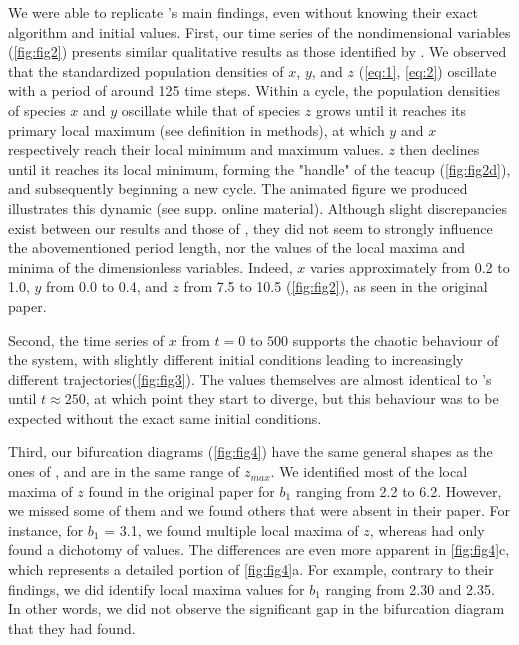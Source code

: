 We were able to replicate \citeauthor{hastings1991}'s main findings, even without knowing their
exact algorithm and initial values.
First, our time series of the nondimensional variables (\autoref{fig:fig2}) presents similar
qualitative results as those identified by \citeauthor{hastings1991}.
We observed that the standardized population densities of $x$, $y$, and $z$ (\autoref{eq:1}, \autoref{eq:2})
oscillate with a period of around 125 time steps.
Within a cycle, the population densities of species $x$ and $y$ oscillate while that of
species $z$ grows until it reaches its primary local maximum (see definition in methods),
at which $y$ and $x$ respectively reach their local minimum and maximum values.
$z$ then declines until it reaches its local minimum, forming the "handle" of the teacup
(\autoref{fig:fig2d}), and subsequently beginning a new cycle.
The animated figure we produced illustrates this dynamic (see supp.
online material).
Although slight discrepancies exist between our results and those of \citeauthor{hastings1991},
they did not seem to strongly influence the abovementioned period length, nor the values
of the local maxima and minima of the dimensionless variables.
Indeed, $x$ varies approximately from 0.2 to 1.0, $y$ from 0.0 to 0.4, and $z$ from 7.5 to
10.5 (\autoref{fig:fig2}), as seen in the original paper.

Second, the time series of $x$ from $t = 0$ to $500$ supports the chaotic behaviour of the
system, with slightly different initial conditions leading to increasingly different
trajectories(\autoref{fig:fig3}). The values themselves are almost identical to \citeauthor{hastings1991}'s
until $t \approx 250$, at which point they start to diverge, but this behaviour was to be
expected without the exact same initial conditions.

Third, our bifurcation diagrams (\autoref{fig:fig4}) have the same general shapes as the ones of
\citeauthor{hastings1991}, and are in the same range of $z_{max}$. We identified most of the
local maxima of $z$ found in the original paper for $b_1$ ranging from 2.2 to 6.2.
However, we missed some of them and we found others that were absent in their paper.
For instance, for $b_1$ = 3.1, we found multiple local maxima of $z$, whereas \citeauthor{hastings1991} had only found a dichotomy of values.
The differences are even more apparent in \autoref{fig:fig4}c, which represents a detailed
portion of \autoref{fig:fig4}a. For example, contrary to their findings, we did identify local
maxima values for $b_1$ ranging from 2.30 and 2.35. In other words, we did not observe the
significant gap in the bifurcation diagram that they had found.

